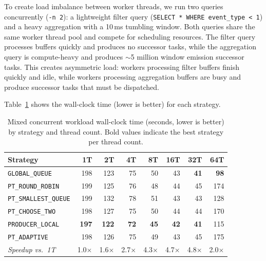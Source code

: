 To create load imbalance between worker threads, we run two queries concurrently (\texttt{-n\,2}): a lightweight filter query (\texttt{SELECT * WHERE event\_type < 1}) and a heavy aggregation with a 10\,ms tumbling window.
Both queries share the same worker thread pool and compete for scheduling resources.
The filter query processes buffers quickly and produces no successor tasks, while the aggregation query is compute-heavy and produces $\sim$5 million window emission successor tasks.
This creates asymmetric load: workers processing filter buffers finish quickly and idle, while workers processing aggregation buffers are busy and produce successor tasks that must be dispatched.

Table~\ref{tab:mixed-strategies} shows the wall-clock time (lower is better) for each strategy.

\begin{table}[h]
\centering
\caption{Mixed concurrent workload wall-clock time (seconds, lower is better) by strategy and thread count. Bold values indicate the best strategy per thread count.}
\label{tab:mixed-strategies}
\begin{tabular}{l|rrrrrrr}
\hline
\textbf{Strategy} & \textbf{1T} & \textbf{2T} & \textbf{4T} & \textbf{8T} & \textbf{16T} & \textbf{32T} & \textbf{64T} \\
\hline
\texttt{GLOBAL\_QUEUE}      & 198 & 123 & 75 & 50 & 43 & \textbf{41} & \textbf{98} \\
\texttt{PT\_ROUND\_ROBIN}   & 199 & 125 & 76 & 48 & 44 & 45 & 174 \\
\texttt{PT\_SMALLEST\_QUEUE}& 199 & 132 & 78 & 51 & 43 & 43 & 128 \\
\texttt{PT\_CHOOSE\_TWO}    & 198 & 127 & 75 & 50 & 44 & 44 & 170 \\
\texttt{PRODUCER\_LOCAL}    & \textbf{197} & \textbf{122} & \textbf{72} & \textbf{45} & \textbf{42} & \textbf{41} & 115 \\
\texttt{PT\_ADAPTIVE}       & 198 & 126 & 75 & 49 & 43 & 45 & 175 \\
\hline
\textit{Speedup vs.\ 1T}   & 1.0$\times$ & 1.6$\times$ & 2.7$\times$ & 4.3$\times$ & 4.7$\times$ & 4.8$\times$ & 2.0$\times$ \\
\hline
\end{tabular}
\end{table}

